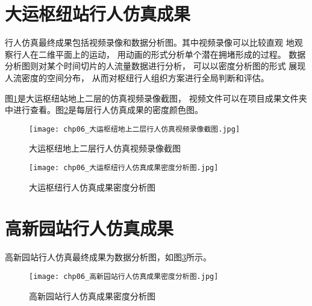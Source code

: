 \section{大运枢纽站行人仿真成果}
行人仿真最终成果包括视频录像和数据分析图。其中视频录像可以比较直观
地观察行人在二维平面上的运动， 用动画的形式分析单个潜在拥堵形成的过程。
数据分析图则对某个时间切片的人流量数据进行分析， 可以以密度分析图的形式
展现人流密度的空间分布， 从而对枢纽行人组织方案进行全局判断和评估。

图\ref{fig:chp06_大运枢纽地上二层行人仿真视频录像截图}是大运枢纽站地上二层的仿真视频录像截图， 视频文件可以在项目成果文件夹中进行查看。图\ref{fig:chp06_大运枢纽行人仿真成果密度分析图}是每层行人仿真成果的密度颜色图。

\begin{figure}[!ht]
  \centering
  \texttt{[image: chp06\_大运枢纽地上二层行人仿真视频录像截图.jpg]}
  \caption{大运枢纽地上二层行人仿真视频录像截图\label{fig:chp06_大运枢纽地上二层行人仿真视频录像截图} }
\end{figure}

\begin{figure}[!ht]
  \centering
  \texttt{[image: chp06\_大运枢纽行人仿真成果密度分析图.jpg]}
  \caption{大运枢纽行人仿真成果密度分析图\label{fig:chp06_大运枢纽行人仿真成果密度分析图} }
\end{figure}

\section{高新园站行人仿真成果}
高新园站行人仿真最终成果为数据分析图，如图\ref{fig:chp06_高新园站行人仿真成果密度分析图}所示。

\begin{figure}[!ht]
  \centering
  \texttt{[image: chp06\_高新园站行人仿真成果密度分析图.jpg]}
  \caption{高新园站行人仿真成果密度分析图\label{fig:chp06_高新园站行人仿真成果密度分析图} }
\end{figure}




